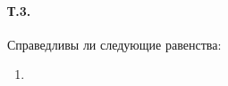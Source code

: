 \documentclass[a4paper,12pt]{article} %
\begin{document}
\paragraph{Т.3.} Справедливы ли следующие равенства:
\begin{enumerate}
	\item 
\end{enumerate}
\end{document}
